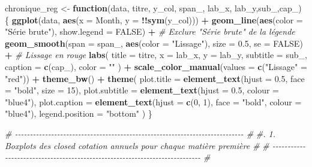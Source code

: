 \documentclass[
]{article}
\newenvironment{Shaded}{\begin{snugshade}}{\end{snugshade}}
\newcommand{\AttributeTok}[1]{\textcolor[rgb]{0.13,0.29,0.53}{#1}}
\newcommand{\CommentTok}[1]{\textcolor[rgb]{0.56,0.35,0.01}{\textit{#1}}}
\newcommand{\ConstantTok}[1]{\textcolor[rgb]{0.56,0.35,0.01}{#1}}
\newcommand{\ControlFlowTok}[1]{\textcolor[rgb]{0.13,0.29,0.53}{\textbf{#1}}}
\newcommand{\DecValTok}[1]{\textcolor[rgb]{0.00,0.00,0.81}{#1}}
\newcommand{\FloatTok}[1]{\textcolor[rgb]{0.00,0.00,0.81}{#1}}
\newcommand{\FunctionTok}[1]{\textcolor[rgb]{0.13,0.29,0.53}{\textbf{#1}}}
\newcommand{\NormalTok}[1]{#1}
\newcommand{\OtherTok}[1]{\textcolor[rgb]{0.56,0.35,0.01}{#1}}
\newcommand{\SpecialCharTok}[1]{\textcolor[rgb]{0.81,0.36,0.00}{\textbf{#1}}}
\newcommand{\StringTok}[1]{\textcolor[rgb]{0.31,0.60,0.02}{#1}}
\begin{document}
\begin{Shaded}
\begin{Highlighting}[]
\NormalTok{chronique\_reg }\OtherTok{\textless{}{-}} \ControlFlowTok{function}\NormalTok{(data, titre, y\_col, span\_, lab\_x, lab\_y,sub\_,cap\_) \{}
  \FunctionTok{ggplot}\NormalTok{(data, }\FunctionTok{aes}\NormalTok{(}\AttributeTok{x =}\NormalTok{ Month, }\AttributeTok{y =} \SpecialCharTok{!!}\FunctionTok{sym}\NormalTok{(y\_col))) }\SpecialCharTok{+} 
    \FunctionTok{geom\_line}\NormalTok{(}\FunctionTok{aes}\NormalTok{(}\AttributeTok{color =} \StringTok{"Série brute"}\NormalTok{), }\AttributeTok{show.legend =} \ConstantTok{FALSE}\NormalTok{) }\SpecialCharTok{+}  \CommentTok{\# Exclure "Série brute" de la légende}
    \FunctionTok{geom\_smooth}\NormalTok{(}\AttributeTok{span =}\NormalTok{ span\_, }\FunctionTok{aes}\NormalTok{(}\AttributeTok{color =} \StringTok{"Lissage"}\NormalTok{), }\AttributeTok{size =} \FloatTok{0.5}\NormalTok{, }\AttributeTok{se =} \ConstantTok{FALSE}\NormalTok{) }\SpecialCharTok{+}  \CommentTok{\# Lissage en rouge}
    \FunctionTok{labs}\NormalTok{(}
      \AttributeTok{title =}\NormalTok{ titre,}
      \AttributeTok{x =}\NormalTok{ lab\_x,}
      \AttributeTok{y =}\NormalTok{ lab\_y,}
      \AttributeTok{subtitle =}\NormalTok{ sub\_,}
      \AttributeTok{caption =} \FunctionTok{c}\NormalTok{(cap\_),}
      \AttributeTok{color =} \StringTok{""}
\NormalTok{    ) }\SpecialCharTok{+} 
    \FunctionTok{scale\_color\_manual}\NormalTok{(}\AttributeTok{values =} \FunctionTok{c}\NormalTok{(}\StringTok{"Lissage"} \OtherTok{=} \StringTok{"red"}\NormalTok{)) }\SpecialCharTok{+} 
    \FunctionTok{theme\_bw}\NormalTok{() }\SpecialCharTok{+} 
    \FunctionTok{theme}\NormalTok{(}
      \AttributeTok{plot.title =} \FunctionTok{element\_text}\NormalTok{(}\AttributeTok{hjust =} \FloatTok{0.5}\NormalTok{, }\AttributeTok{face =} \StringTok{"bold"}\NormalTok{, }\AttributeTok{size =} \DecValTok{15}\NormalTok{),}
      \AttributeTok{plot.subtitle =} \FunctionTok{element\_text}\NormalTok{(}\AttributeTok{hjust =} \FloatTok{0.5}\NormalTok{, }\AttributeTok{colour =} \StringTok{"blue4"}\NormalTok{),}
      \AttributeTok{plot.caption =} \FunctionTok{element\_text}\NormalTok{(}\AttributeTok{hjust =} \FunctionTok{c}\NormalTok{(}\DecValTok{0}\NormalTok{, }\DecValTok{1}\NormalTok{), }\AttributeTok{face =} \StringTok{"bold"}\NormalTok{, }\AttributeTok{colour =} \StringTok{"blue4"}\NormalTok{),}
      \AttributeTok{legend.position =} \StringTok{"bottom"}
\NormalTok{    )}
\NormalTok{\}}

\CommentTok{\# {-}{-}{-}{-}{-}{-}{-}{-}{-}{-}{-}{-}{-}{-}{-}{-}{-}{-}{-}{-}{-}{-}{-}{-}{-}{-}{-}{-}{-}{-}{-}{-}{-}{-}{-}{-}{-}{-}{-}{-}{-}{-}{-}{-}{-}{-}{-}{-}{-}{-}{-}{-}{-}{-}{-}{-}{-}{-}{-}{-}{-}{-}{-}{-}{-}{-}{-}{-}{-}{-}{-}{-}{-}{-}{-}{-} \#}
\CommentTok{\#.      1. Boxplots des closed cotation annuels pour chaque matière première   \# }
\CommentTok{\# {-}{-}{-}{-}{-}{-}{-}{-}{-}{-}{-}{-}{-}{-}{-}{-}{-}{-}{-}{-}{-}{-}{-}{-}{-}{-}{-}{-}{-}{-}{-}{-}{-}{-}{-}{-}{-}{-}{-}{-}{-}{-}{-}{-}{-}{-}{-}{-}{-}{-}{-}{-}{-}{-}{-}{-}{-}{-}{-}{-}{-}{-}{-}{-}{-}{-}{-}{-}{-}{-}{-}{-}{-}{-}{-}{-} \#}


\end{Highlighting}
\end{Shaded}
\end{document}
